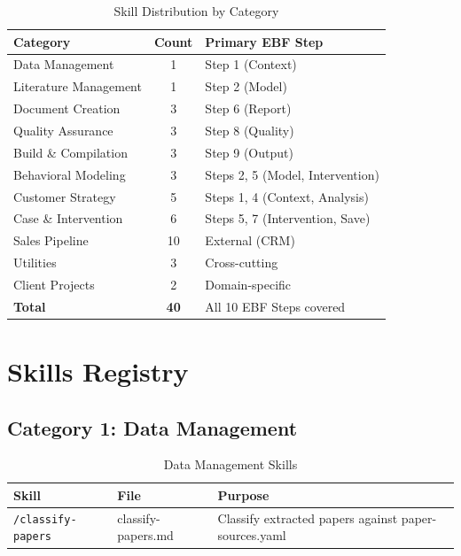 \begin{table}[htbp]
\centering
\begin{tabular}{|l|c|l|}
\hline
\textbf{Category} & \textbf{Count} & \textbf{Primary EBF Step} \\
\hline
Data Management & 1 & Step 1 (Context) \\
Literature Management & 1 & Step 2 (Model) \\
Document Creation & 3 & Step 6 (Report) \\
Quality Assurance & 3 & Step 8 (Quality) \\
Build \& Compilation & 3 & Step 9 (Output) \\
Behavioral Modeling & 3 & Steps 2, 5 (Model, Intervention) \\
Customer Strategy & 5 & Steps 1, 4 (Context, Analysis) \\
Case \& Intervention & 6 & Steps 5, 7 (Intervention, Save) \\
Sales Pipeline & 10 & External (CRM) \\
Utilities & 3 & Cross-cutting \\
Client Projects & 2 & Domain-specific \\
\hline
\textbf{Total} & \textbf{40} & All 10 EBF Steps covered \\
\hline
\end{tabular}
\caption{Skill Distribution by Category}
\end{table}


\section{Skills Registry}
\label{sec:skills-registry}

\subsection{Category 1: Data Management}

\begin{table}[htbp]
\centering
\begin{tabular}{|l|l|p{6cm}|}
\hline
\textbf{Skill} & \textbf{File} & \textbf{Purpose} \\
\hline
\texttt{/classify-papers} & classify-papers.md & Classify extracted papers against paper-sources.yaml \\
\hline
\end{tabular}
\caption{Data Management Skills}
\end{table}


